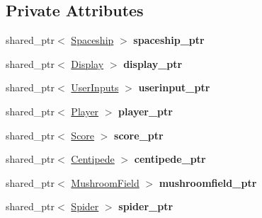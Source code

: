 \subsection*{Private Attributes}
\begin{DoxyCompactItemize}
\item 
\mbox{\label{class_game_loop_a883be839ff47995255be24d4ba27beb5}} 
shared\+\_\+ptr$<$ \mbox{\hyperlink{class_spaceship}{Spaceship}} $>$ {\bfseries spaceship\+\_\+ptr}
\item 
\mbox{\label{class_game_loop_a481925677c0b272dd769d5747fd50b26}} 
shared\+\_\+ptr$<$ \mbox{\hyperlink{class_display}{Display}} $>$ {\bfseries display\+\_\+ptr}
\item 
\mbox{\label{class_game_loop_a1236541eba5f85cf34b5ccfdc4e04b5d}} 
shared\+\_\+ptr$<$ \mbox{\hyperlink{class_user_inputs}{User\+Inputs}} $>$ {\bfseries userinput\+\_\+ptr}
\item 
\mbox{\label{class_game_loop_aaddd8cb422026374b3531d6b18ac5dc0}} 
shared\+\_\+ptr$<$ \mbox{\hyperlink{class_player}{Player}} $>$ {\bfseries player\+\_\+ptr}
\item 
\mbox{\label{class_game_loop_ac214d5efc82341ddfe9878aa96bbbad9}} 
shared\+\_\+ptr$<$ \mbox{\hyperlink{class_score}{Score}} $>$ {\bfseries score\+\_\+ptr}
\item 
\mbox{\label{class_game_loop_a34fbdac44cbb6f27628ce99b974979c3}} 
shared\+\_\+ptr$<$ \mbox{\hyperlink{class_centipede}{Centipede}} $>$ {\bfseries centipede\+\_\+ptr}
\item 
\mbox{\label{class_game_loop_a5c73d495f7afc40199c77ab6bce322a2}} 
shared\+\_\+ptr$<$ \mbox{\hyperlink{class_mushroom_field}{Mushroom\+Field}} $>$ {\bfseries mushroomfield\+\_\+ptr}
\item 
\mbox{\label{class_game_loop_a517dfbe4c19a9cf55346c943b94094bd}} 
shared\+\_\+ptr$<$ \mbox{\hyperlink{class_spider}{Spider}} $>$ {\bfseries spider\+\_\+ptr}
\item 
\mbox{\label{class_game_loop_a3dca38af8ecdca9faaffe6ac08c91c95}} 

\end{DoxyCompactItemize}
